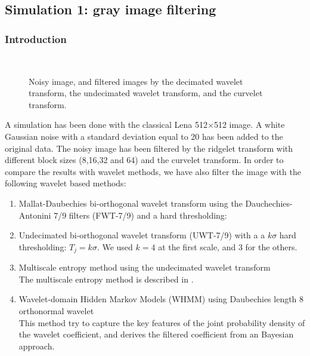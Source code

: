 \documentclass{article}
\begin{document}
\subsection{Simulation 1: gray image filtering}
\subsubsection{Introduction}

\begin{figure}[htb]
\centerline{
\vbox{
\hbox{
}
\hbox{
}}}
\caption{Noisy image, and filtered images by the decimated wavelet transform,
the undecimated wavelet
transform, and the curvelet transform.}
\label{fig_cur_lenna}
\end{figure}

A simulation has been done with the classical
Lena 512$\times$512 image. A white Gaussian noise 
with a standard deviation equal to 20 has been added to the
original data. The noisy image has been filtered by the ridgelet 
transform with different block sizes (8,16,32 and 64) 
and the curvelet transform. In order to compare the 
results with wavelet methods, we have also filter the image
with the following wavelet based methods:
\begin{enumerate}
\item Mallat-Daubechies bi-orthogonal wavelet transform using the Dauchechies-
Antonini 7/9 filters (FWT-7/9) 
and a hard thresholding:

\item Undecimated bi-orthogonal wavelet transform (UWT-7/9) with a
a $k\sigma$ hard thresholding: $T_j = k \sigma$. We used $k=4$ at the
first scale, and 3 for the others.
\item Multiscale entropy method using the undecimated wavelet transform\\
The multiscale entropy method is described in \cite{starck:sta98_2,starck:sta99_2}.

\item Wavelet-domain Hidden Markov Models (WHMM) using Daubechies length 8 orthonormal wavelet \\
This method \cite{wave:crouse98} try to capture  the key 
features of the joint probability density of the wavelet coefficient,
and derives the filtered coefficient from an Bayesian approach.
\end{enumerate}
\end{document}
